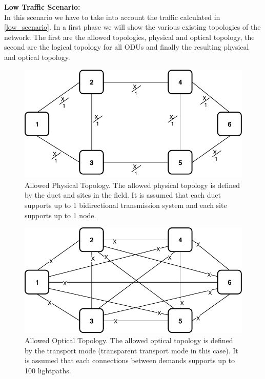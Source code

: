 \newpage
\textbf{Low Traffic Scenario:}\\

In this scenario we have to take into account the traffic calculated in \ref{low_scenario}. In a first phase we will show the various existing topologies of the network. The first are the allowed topologies, physical and optical topology, the second are the logical topology for all ODUs and finally the resulting physical and optical topology.\\

\begin{figure}[h!]
\centering
\includegraphics[width=13cm]{sdf/ilp/transparent_protection/figures/allowed_physical_topology}
\caption{Allowed Physical Topology. The allowed physical topology is defined by the duct and sites in the field. It is assumed that each duct supports up to 1 bidirectional transmission system and each site supports up to 1 node.}
\label{allowed2_physical_protectionlow}
\end{figure}

\begin{figure}[h!]
\centering
\includegraphics[width=13cm]{sdf/ilp/transparent_protection/figures/allowed_optical_topology}
\caption{Allowed Optical Topology. The allowed optical topology is defined by the transport mode (transparent transport mode in this case). It is assumed that each connections between demands supports up to 100 lightpaths.}
\label{allowed2_optical_protectionlow}
\end{figure}

